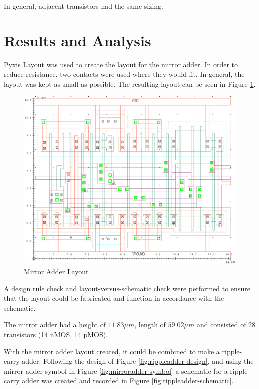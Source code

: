 \documentclass[11pt]{article}
\begin{document}
		In general, adjacent transistors had the same sizing.
	

\section{Results and Analysis}

	Pyxis Layout was used to create the layout for the mirror adder. In order to reduce resistance, two contacts were used where they would fit. In general, the layout was kept as small as possible. The resulting layout can be seen in Figure \ref{fig:mirroradder-layout}.
	
	\begin{figure}[H]
		\centering
		\includegraphics[width=1\linewidth]{"Pictures/MirrorAdder Layout"}
		\caption{Mirror Adder Layout}
		\label{fig:mirroradder-layout}
	\end{figure}

	A design rule check and layout-versus-schematic check were performed to ensure that the layout could be fabricated and function in accordance with the schematic. 
	
	The mirror adder had a height of $11.83\mu m$, length of $59.02\mu m$ and consisted of 28 transistors (14 nMOS, 14 pMOS).
	
	With the mirror adder layout created, it could be combined to make a ripple-carry adder. Following the design of Figure \ref{fig:rippleadder-design}, and using the mirror adder symbol in Figure \ref{fig:mirroradder-symbol} a schematic for a ripple-carry adder was created and recorded in Figure \ref{fig:rippleadder-schematic}.
\end{document}
